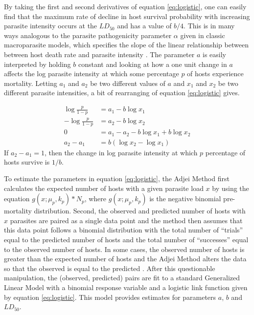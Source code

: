 \documentclass[12pt, a4paper]{article}
\begin{document}
By taking the first and second derivatives of equation \ref{eq:logistic}, one can easily find that the maximum rate of decline in host survival probability with increasing parasite intensity occurs at the $LD_{50}$ and has a value of $b / 4$.  This is in many ways analogous to the parasite pathogenicity parameter $\alpha$ given in classic macroparasite models, which specifies the slope of the linear relationship between between host death rate and parasite intensity \citep{AndersonandMay1978, Isham1995}.  The parameter $a$ is easily interpreted by holding $b$ constant and looking at how a one unit change in $a$ affects the log parasite intensity at which some percentage $p$ of hosts experience mortality.  Letting $a_1$ and $a_2$ be two different values of $a$ and $x_1$ and $x_2$ be two different parasite intensities, a bit of rearranging of equation \ref{eq:logistic} gives.

\begin{align*}
    \log{\frac{p}{1 - p}} &= a_1 - b \log{x_1}\\
    - \log{\frac{p}{1 - p}} &= a_2 - b \log{x_2}\\
    0 &= a_1 - a_2 - b\log{x_1} + b\log{x_2}\\
    a_2 - a_1 &= b(\log{x_2} - \log{x_1})
\end{align*}
If $a_2 - a_1 = 1$, then the change in log parasite intensity at which $p$ percentage of hosts survive is $1 / b$.

To estimate the parameters in equation \ref{eq:logistic}, the Adjei Method first
calculates the expected number of hosts with a given parasite load $x$ by using
the equation $g(x ; \mu_p, k_p) * N_p$, where $g(x ; \mu_p, k_p)$ is the negative binomial pre-mortality distribution.  Second, the observed and predicted number of hosts
with $x$ parasites are paired as a single data point and the method then assumes that
this data point follows a binomial distribution with the total number of
``trials'' equal to the predicted number of hosts and the total number of
``successes'' equal to the observed number of hosts. In some cases, the
observed number of hosts is greater than the expected number of hosts and the
Adjei Method alters the data so that the observed is equal to the predicted
\citep{Adjei1986}.  After this questionable manipulation, the (observed, predicted) pairs are fit to a standard Generalized Linear Model \citep{McCullagh1989} with a binomial response variable and a logistic link function given by equation \ref{eq:logistic}.  This model provides estimates for parameters $a$, $b$ and $LD_{50}$.
\end{document}
